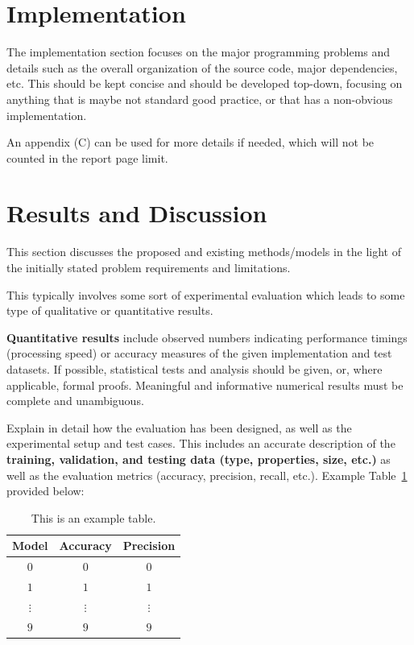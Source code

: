 \documentclass{article}
\begin{document}
\section{Implementation}
The implementation section focuses on the major programming problems and details such as the overall organization of the source code, major dependencies, etc. This should be kept concise and should be developed top-down, focusing on anything that is maybe not standard good practice, or that has a non-obvious implementation. 

An appendix (C) can be used for more details if needed, which will not be counted in the report page limit. 

\section{Results and Discussion}
This section discusses the proposed and existing methods/models in the light of the initially stated problem requirements and limitations. 

This typically involves some sort of experimental evaluation which leads to some type of qualitative or quantitative results. 

\textbf{Quantitative results} include observed numbers indicating performance timings (processing speed) or accuracy measures of the given implementation and test datasets. If possible, statistical tests and analysis should be given, or, where applicable, formal proofs. Meaningful and informative numerical results must be complete and unambiguous. 

Explain in detail how the evaluation has been designed, as well as the experimental setup and test cases. This includes an accurate description of the \textbf{training, validation, and testing data (type, properties, size, etc.)} as well as the evaluation metrics (accuracy, precision, recall, etc.). Example Table~\ref{tab} provided below:

\begin{table}[t]
\centering
\begin{tabular}{|cc|c|}
\hline
Model      & Accuracy      & Precision      \\
\hline
$0     $ & $0     $ & $0     $ \\
$1     $ & $1     $ & $1     $ \\
$\vdots$ & $\vdots$ & $\vdots$ \\
$9     $ & $9     $ & $9     $ \\
\hline
\end{tabular}
\caption{This is an example table.}
\label{tab}
\end{table}
\end{document}

